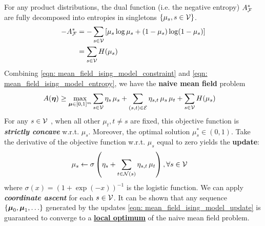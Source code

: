 \documentclass[11pt]{article}
\begin{document}
\begin{itemize}
For any product distributions, the dual function (i.e. the negative entropy) $A_{{\mathcal F}}^{*}$ are fully decomposed into entropies in singletons $\left\{\mu_{s}, s\in {\mathcal V}\right\}$. 
\begin{align}
-A_{{\mathcal F}}^{*} &= -\sum_{s\in {\mathcal V}}\left[\mu_{s} \log \mu_{s} + (1-\mu_{s}) \log (1- \mu_{s})\right] \label{eqn: mean_field_ising_model_entropy} \\
&= \sum_{s\in {\mathcal V}}H(\mu_{s}) \nonumber
\end{align} Combining \eqref{eqn: mean_field_ising_model_constraint} and \eqref{eqn: mean_field_ising_model_entropy}, we have the \textbf{naive mean field}
problem
\begin{align}
A(\boldsymbol{\eta}) \ge \max_{\boldsymbol{\mu} \in [0,1]^{m}} & \sum_{s\in {\mathcal V}}\eta_{s}\,\mu_s  + \sum_{(s,t)\in {\mathcal E}}\eta_{s,t}\,\mu_{s}\,\mu_{t} + \sum_{s\in {\mathcal V}}H(\mu_{s}) \label{eqn: mean_field_ising_model}
\end{align} For any $s \in {\mathcal V}$ , when all other $\mu_t, t\neq s$ are fixed, this objective function is \emph{\textbf{strictly concave}} w.r.t. $\mu_s$. Moreover, the optimal solution $\mu_s^{*} \in (0, 1)$. Take the derivative of the objective function w.r.t. $\mu_s$ equal to zero yields the \textbf{update}:
\begin{align}
\mu_s &\leftarrow \sigma\left(\eta_s + \sum_{t\in {\mathcal N}(s)}\eta_{s,t}\,\mu_{t}\right), \forall s\in {\mathcal V} \label{eqn: mean_field_ising_model_update}
\end{align} where  $\sigma(x) = (1 + \exp(-x))^{-1}$ is the logistic function. We can apply \textbf{\emph{coordinate ascent}} for each $s\in {\mathcal V}$. It can be shown that any sequence $\{\boldsymbol{\mu}_0, \boldsymbol{\mu}_1, \ldots\}$ generated by the updates \eqref{eqn: mean_field_ising_model_update} is guaranteed to converge to a \underline{\textbf{local optimum}} of the naive mean field problem. 



\end{itemize}
\end{document}
